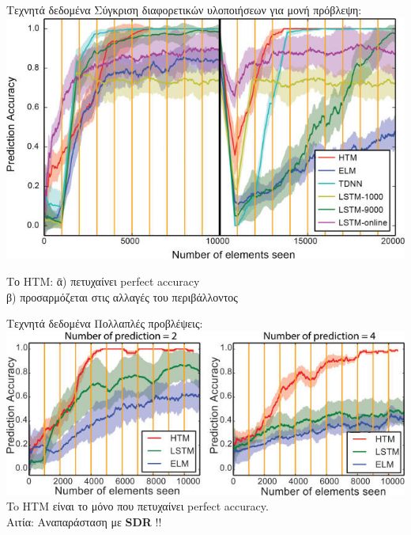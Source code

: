 \documentclass[11pt,center]{beamer}
\begin{document}
	\begin{frame}{Τεχνητά δεδομένα}
		Σύγκριση διαφορετικών υλοποιήσεων για μονή πρόβλεψη:\\
		\vspace{1em}
		\includegraphics[width=0.7 \textwidth,center]{../pics/single_prediction.jpg}
		\pause
		\begin{tabbing}
  			Το HTM:  \=α) πετυχαίνει perfect accuracy\\
  			\>β) προσαρμόζεται στις αλλαγές του περιβάλλοντος\\
  		\end{tabbing}
	\end{frame}

	\begin{frame}{Τεχνητά δεδομένα}
		Πολλαπλές προβλέψεις:
		\vfill
		\includegraphics[width=0.7 \textwidth,center]{../pics/multiple_predictions.jpg}
		\pause
		\vfill
		To HTM είναι το \alert{μόνο} που πετυχαίνει perfect accuracy.\\
		\pause
		Αιτία: Αναπαράσταση με \textbf{SDR} !!
	\end{frame}
\end{document}

